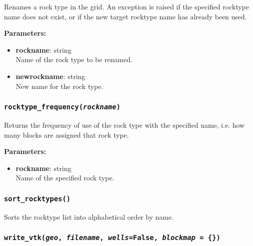 Renames a rock type in the grid. An exception is raised if the specified rocktype name does not exist, or if the new target rocktype name has already been used.

\textbf{Parameters:}
\begin{itemize}
\item \textbf{rockname}: string\\
  Name of the rock type to be renamed.
\item \textbf{newrockname}: string\\
  New name for the rock type.
\end{itemize}

\begin{snugshade}
\subsubsection{\texttt{rocktype\_frequency(\emph{rockname})}}
\end{snugshade}
\label{sec:t2grid:rocktype_frequency}

Returns the frequency of use of the rock type with the specified name, i.e. how many blocks are assigned that rock type.

\textbf{Parameters:}
\begin{itemize}
\item \textbf{rockname}: string\\
  Name of the specified rock type.
\end{itemize}

\begin{snugshade}
\subsubsection{\texttt{sort\_rocktypes()}}
\end{snugshade}
\label{sec:t2grid:sort_rocktypes}

Sorts the rocktype list into alphabetical order by name.

\begin{snugshade}
\subsubsection{\texttt{write\_vtk(\emph{geo}, \emph{filename}, \emph{wells}=False, \emph{blockmap} = \{\})}}
\end{snugshade}
\label{sec:t2grid:write_vtk}

